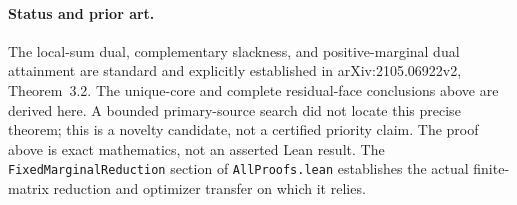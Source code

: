 \paragraph{Status and prior art.}
The local-sum dual, complementary slackness, and positive-marginal dual
attainment are standard and explicitly established in
arXiv:2105.06922v2, Theorem~3.2. The unique-core and complete residual-face
conclusions above are derived here. A bounded primary-source
search did not locate this precise theorem; this is a novelty candidate,
not a certified priority claim. The proof above is exact mathematics, not
an asserted Lean result. The \texttt{FixedMarginalReduction} section of \texttt{AllProofs.lean} establishes the actual finite-matrix
reduction and optimizer transfer on which it relies.
